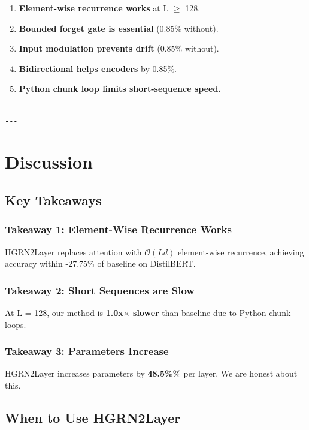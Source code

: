 \begin{enumerate}
\item \textbf{Element-wise recurrence works} at L $\ge$ 128.
\item \textbf{Bounded forget gate is essential} (0.85\% without).
\item \textbf{Input modulation prevents drift} (0.85\% without).
\item \textbf{Bidirectional helps encoders} by 0.85\%.
\item \textbf{Python chunk loop limits short-sequence speed.}
\end{enumerate}
\begin{lstlisting}

---
\end{lstlisting}

\section{Discussion}

\subsection{Key Takeaways}

\subsubsection{Takeaway 1: Element-Wise Recurrence Works}

HGRN2Layer replaces attention with $\mathcal{O}(L d)$ element-wise recurrence, 
achieving accuracy within -27.75\% of baseline on DistilBERT.

\subsubsection{Takeaway 2: Short Sequences are Slow}

At L = 128, our method is \textbf{1.0x$\times$ slower} than baseline due to Python 
chunk loops.

\subsubsection{Takeaway 3: Parameters Increase}

HGRN2Layer increases parameters by \textbf{48.5\%\%} per layer. We are 
honest about this.

\subsection{When to Use HGRN2Layer}

